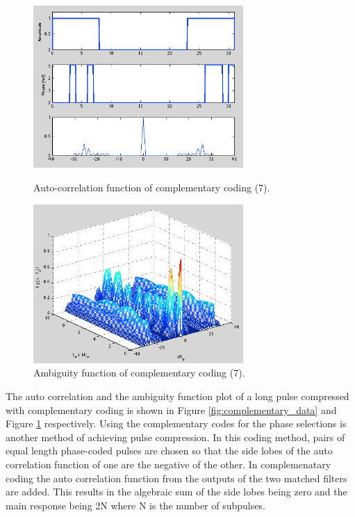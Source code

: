 \documentclass{article}
\begin{document}
\begin{figure}[t!]
\begin{minipage}[t]{0.5\linewidth}
\centering
\includegraphics[width=8cm]{Figures/complementary_data.png}
\caption{Auto-correlation function of complementary coding (7).}
\label{fig:complementary_data}
\end{minipage}
\begin{minipage}[t]{0.5\linewidth}
\centering
\includegraphics[width=8cm]{Figures/complementary_3d.png}
\caption{Ambiguity function of complementary coding (7).}
\label{fig:complementary_3d}
\end{minipage}
\end{figure}

The auto correlation and the ambiguity function plot of a long pulse compressed with complementary coding is shown in Figure \ref{fig:complementary_data} and Figure \ref{fig:complementary_3d} respectively. Using the complementary codes for the phase selections is another method of achieving pulse compression. In this coding method, pairs of equal length phase-coded pulses are chosen so that the side lobes of the auto correlation function of one are the negative of the other. In complemenatary coding  the auto correlation function from the outputs of the two matched filters are added. This results in the algebraic sum of the side lobes being zero and the main response being 2N where N is the number of subpulses.
\end{document}
